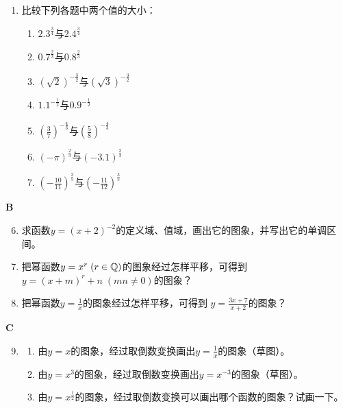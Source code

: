 \begin{enumerate}
 \item 比较下列各题中两个值的大小：
 \begin{multicols}{2}
 \begin{enumerate}[(1)]
     \item $2.3^{\tfrac{3}{4}}$与$2.4^{\tfrac{3}{4}}$
     \item $0.7^{\tfrac{2}{3}}$与$0.8^{\tfrac{2}{3}}$
     \item $\left(\sqrt{2}\right)^{-\tfrac{3}{2}}$与$\left(\sqrt{3}\right)^{-\tfrac{3}{2}}$
     \item $1.1^{-\tfrac{1}{2}}$与$0.9^{-\tfrac{1}{2}}$
     \item $\left(\frac{3}{7}\right)^{-\tfrac{4}{3}}$与$\left(\frac{5}{8}\right)^{-\tfrac{4}{3}}$
     \item $(-\pi)^{\tfrac{2}{3}}$与$(-3.1)^{\tfrac{2}{3}}$
     \item $\left(-\frac{10}{11}\right)^{\tfrac{3}{5}}$与$\left(-\frac{11}{12}\right)^{\tfrac{3}{5}}$
 \end{enumerate}
 \end{multicols}
 
 \end{enumerate}
 
 \begin{center}
     \bfseries B
 \end{center}
 
 \begin{enumerate}\setcounter{enumi}{5}
     \item 求函数$y=(x+2)^{-2}$的定义域、值域，画出它的图象，并写出它的单调区间。
 \item     把幂函数$y=x^r\; (r\in\mathbb{Q})$的图象经过怎样平移，可得到$y=(x+m)^r+n\; (mn\ne 0)$的图象？
 \item     把幂函数$y=\frac{1}{x}$的图象经过怎样平移，可得到
     $y=\frac{3x+7}{x+2}$的图象？
 \end{enumerate}
 
 
 \begin{center}
     \bfseries C
 \end{center}
 
 \begin{enumerate}\setcounter{enumi}{8}
 \item \begin{enumerate}[(1)]
     \item 由$y=x$的图象，经过取倒数变换画出$y=\frac{1}{x}$的图象（草图）。
     \item 由$y=x^3$的图象，经过取倒数变换画出$y=x^{-3}$的图象（草图）。
     \item 由$y=x^{\tfrac{1}{2}}$的图象，经过取倒数变换可以画出哪个函数的图象？试画一下。
 \end{enumerate}
 \end{enumerate}
 
